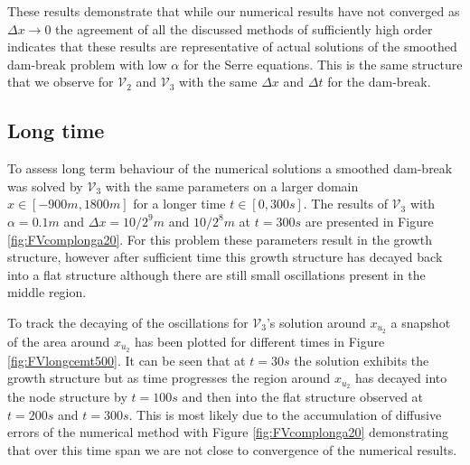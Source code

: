 \documentclass[times]{elsarticle}
\begin{document}
These results demonstrate that while our numerical results have not converged as $\Delta x \rightarrow 0$ the agreement of all the discussed methods of sufficiently high order indicates that these results are representative of actual solutions of the smoothed dam-break problem with low $\alpha$ for the Serre equations. This is the same structure that we observe for $\mathcal{V}_2$ and $\mathcal{V}_3$ with the same $\Delta x$ and $\Delta t$ for the dam-break.


\subsection{Long time}\label{subsubsec:LT}
To assess long term behaviour of the numerical solutions a smoothed dam-break was solved by $\mathcal{V}_3$ with the same parameters on a larger domain $x \in [-900m, 1800m]$ for a longer time $t \in [0,300s]$. The results of $\mathcal{V}_3$ with $\alpha = 0.1m$ and $\Delta x = 10/2^{9}m$ and $10/2^{8}m$ at $t = 300s$ are presented in Figure \ref{fig:FVcomplonga20}. For this problem these parameters result in the growth structure, however after sufficient time this growth structure has decayed back into a flat structure although there are still small oscillations present in the middle region. 

To track the decaying of the oscillations for $\mathcal{V}_3$'s solution around $x_{u_2}$ a snapshot of the area around $x_{u_2}$ has been plotted for different times in Figure \ref{fig:FVlongcemt500}. It can be seen that at $t =30s$ the solution exhibits the growth structure but as time progresses the region around $x_{u_2}$ has decayed into the node structure by $t=100s$ and then into the flat structure observed at $t=200s$ and $t=300s$. This is most likely due to the accumulation of diffusive errors of the numerical method with Figure \ref{fig:FVcomplonga20} demonstrating that over this time span we are not close to convergence of the numerical results.   
\end{document}
